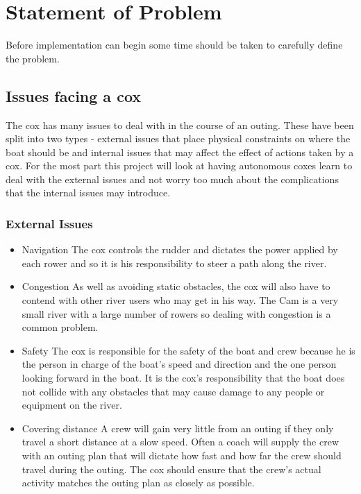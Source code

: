 \chapter{Statement of Problem}

Before implementation can begin some time should be taken to carefully define the problem.

\section{Issues facing a cox}
The cox has many issues to deal with in the course of an outing. These have been split into two types - external issues that place physical constraints on where the boat should be and internal issues that may affect the effect of actions taken by a cox. For the most part this project will look at having autonomous coxes learn to deal with the external issues and not worry too much about the complications that the internal issues may introduce.

\subsection{External Issues}
\begin{itemize}
  
  \item{Navigation} The cox controls the rudder and dictates the power applied by each rower and so it is his responsibility to steer a path along the river.
  
  \item{Congestion} As well as avoiding static obstacles, the cox will also have to contend with other river users who may get in his way. The Cam is a very small river with a large number of rowers so dealing with congestion is a common problem.
  
  \item{Safety} The cox is responsible for the safety of the boat and crew because he is the person in charge of the boat's speed and direction and the one person looking forward in the boat. It is the cox's responsibility that the boat does not collide with any obstacles that may cause damage to any people or equipment on the river.
  
  \item{Covering distance} A crew will gain very little from an outing if they only travel a short distance at a slow speed. Often a coach will supply the crew with an outing plan that will dictate how fast and how far the crew should travel during the outing. The cox should ensure that the crew's actual activity matches the outing plan as closely as possible.
  
\end{itemize}

